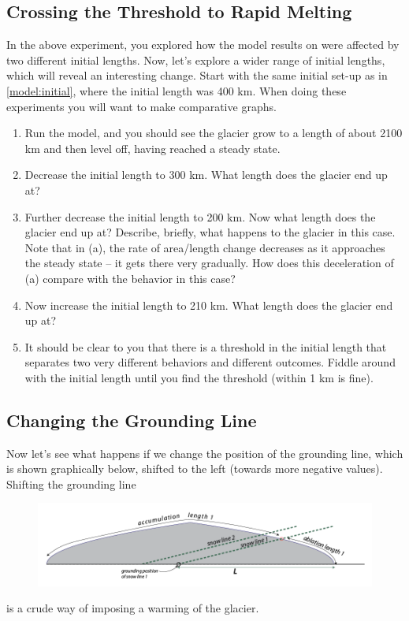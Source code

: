 \documentclass[11pt,letterpaper]{article}
\begin{document}
\subsection{Crossing the Threshold to Rapid Melting}

In the above experiment, you explored how the model results on were affected by two different initial lengths. Now, let’s explore a wider range of initial lengths, which will reveal an interesting change. Start with the same initial set-up as in \ref{model:initial}, where the initial length was 400 km. When doing these experiments you will want to make comparative graphs.

\begin{enumerate}[label=(\alph*)]
\item Run the model, and you should see the glacier grow to a length of about 2100 km and then level off, having reached a steady state.  

\item Decrease the initial length to 300 km.  What length does the glacier end up at?

\item Further decrease the initial length to 200 km. Now what length does the glacier end up at?  Describe, briefly, what happens to the glacier in this case.  Note that in (a), the rate of area/length change decreases as it approaches the steady state -- it gets there very gradually.  How does this deceleration of (a) compare with the behavior in this case?

\item Now increase the initial length to 210 km. What length does the glacier end up at? 

\item It should be clear to you that there is a threshold in the initial length that separates two very different behaviors and different outcomes.  Fiddle around with the initial length until you find the threshold (within 1 km is fine).
\end{enumerate}

\subsection{Changing the Grounding Line}

Now let’s see what happens if we change the position of the grounding line, which is shown graphically below, shifted to the left (towards more negative values). Shifting the grounding line 
\begin{figure}[b]
\includegraphics[width=\textwidth]{./grounding_line.png}
\end{figure}
is a crude way of imposing a warming of the glacier. 
\end{document}
